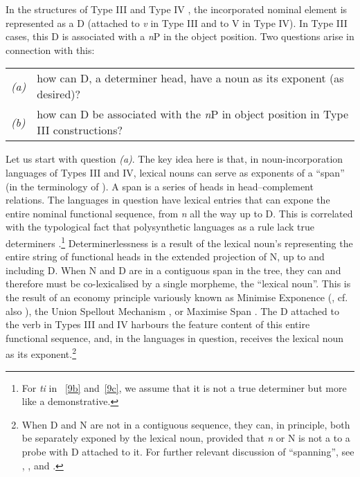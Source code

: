 \documentclass[output=paper]{langsci/langscibook}
\begin{document}
\begin{refcontext}
In the structures of Type III and Type IV , the incorporated nominal
element is represented as a D (attached to \emph{v} in Type III and to V in Type IV). In Type III cases, this
D is associated with a \emph{n}P in the object position. Two questions arise in connection with this:

\vspace{1ex}
\begin{tabularx}{\textwidth}{lX}
\emph{(a)} & how can D, a determiner head, have a noun as its exponent (as desired)?\\
\emph{(b)} & how can D be associated with the \emph{n}P in object position in Type III constructions?\\
\end{tabularx}


\vspace{1ex}

Let us start with question \emph{(a)}. The key idea here is that, in
noun-incorporation languages of Types III and IV, lexical nouns can serve as
exponents of a \enquote{span} (in the terminology of ).  A span is a
series of heads in head--complement relations. The languages in question have
lexical entries that can expone the entire nominal functional sequence, from
\emph{n} all the way up to D.  This is correlated with the typological fact
that polysynthetic languages as a rule lack true determiners
\citep{baker96}.\footnote{For \emph{ti} in ~\eqref{9b} and~\eqref{9c}, we
assume that it is not a true determiner but more like a demonstrative.}
Determinerlessness is a result of the lexical noun's representing the entire
string of functional heads in the extended projection of N, up to and including
D. When N and D are in a contiguous span in the tree, they can and therefore
must be co-lexicalised by a single morpheme, the \enquote{lexical noun}. This is the
result of an economy principle variously known as Minimise Exponence
(\citealt{siddiqi}, cf. also \citealt{noyer93}), the Union Spellout Mechanism
\citep{muriungiunionspo}, or Maximise Span \citep{pantchevalocationsourcegoal}.
The D attached to the verb in Types III and IV harbours the feature content of
this entire functional sequence, and, in the languages in question, receives
the lexical noun as its exponent.\footnote{When D and N are not in a contiguous
    sequence, they can, in principle, both be separately exponed by the lexical
    noun, provided that \emph{n} or N is not a  to a probe with D
attached to it. For further relevant discussion of \enquote{spanning}, see
\cite{ramchand08}, \cite{taraldnguni}, \cite{merchant15} and
\cite{svenonius16}.}


\end{refcontext}
\end{document}

